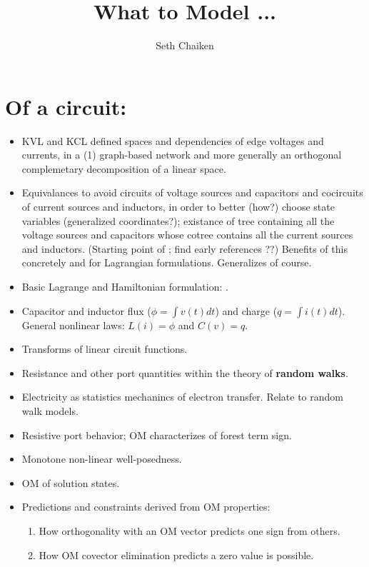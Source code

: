 \documentclass{article}
\title{What to Model ... }
\author{Seth Chaiken}
\begin{document}
\maketitle

\section{Of a circuit:}
\begin{itemize}
\item KVL and KCL defined spaces and dependencies of edge voltages and currents,
in a (1) graph-based network and more generally an orthogonal complemetary
decomposition of a linear space.
\item Equivalances to avoid circuits of voltage sources and capacitors
and cocircuits of current sources and inductors, in order to better (how?)
choose state variables (generalized coordinates?); existance of tree containing
all the voltage sources and capacitors whose cotree contains all the 
current sources and inductors.    (Starting point
of \cite{ChuaMcPhersonLagrange}; find early references ??)
Benefits of this concretely and for Lagrangian formulations.
Generalizes of course.
\item Basic Lagrange and Hamiltonian formulation: 
\cite{ChuaMcPhersonLagrange}.
\item Capacitor and inductor flux ($\phi = \int v(t) dt$) and
charge ($q = \int i(t) dt$).
General nonlinear laws: $L(i) = \phi$ and $C(v) = q$.
\item Transforms of linear circuit functions.
\item Resistance and other port quantities within the theory of 
\textbf{random walks}\cite{DoyleSnellRandom,ProbOnTreesNetworks}.
\item Electricity as statistics mechanincs of electron transfer.  Relate to 
random walk models.
\item Resistive port behavior; OM characterizes of 
forest term sign.
\item Monotone non-linear well-posedness.
\item OM of solution states.
\item Predictions and constraints derived from OM properties:
\begin{enumerate}
\item How orthogonality with an OM vector predicts one sign from others.
\item How OM covector elimination predicts a zero value is possible.
\end{enumerate}

\end{itemize}
\end{document}

